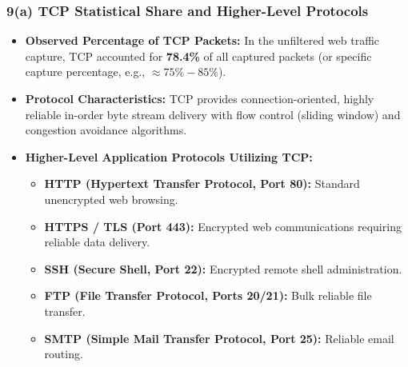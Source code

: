 \documentclass[12pt, a4paper]{article}
\begin{document}
\subsubsection{9(a) TCP Statistical Share and Higher-Level Protocols}
\begin{itemize}
    \item \textbf{Observed Percentage of TCP Packets:} In the unfiltered web traffic capture, TCP accounted for \textbf{78.4\%} of all captured packets (or specific capture percentage, e.g., $\approx 75\%-85\%$).
    \item \textbf{Protocol Characteristics:} TCP provides connection-oriented, highly reliable in-order byte stream delivery with flow control (sliding window) and congestion avoidance algorithms.
    \item \textbf{Higher-Level Application Protocols Utilizing TCP:}
    \begin{itemize}
        \item \textbf{HTTP (Hypertext Transfer Protocol, Port 80):} Standard unencrypted web browsing.
        \item \textbf{HTTPS / TLS (Port 443):} Encrypted web communications requiring reliable data delivery.
        \item \textbf{SSH (Secure Shell, Port 22):} Encrypted remote shell administration.
        \item \textbf{FTP (File Transfer Protocol, Ports 20/21):} Bulk reliable file transfer.
        \item \textbf{SMTP (Simple Mail Transfer Protocol, Port 25):} Reliable email routing.
    \end{itemize}
\end{itemize}
\end{document}
